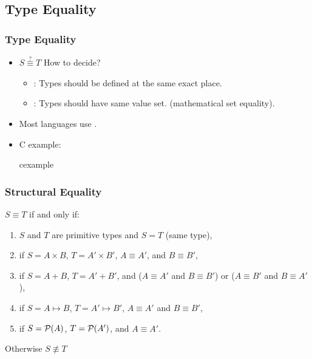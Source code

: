 
\subsection{Type Equality}
\begin{frame}
 \frametitle{Type Equality}
\begin{itemize}[<+->]
 \item $S \stackrel{?}{\equiv}  T$  How to decide?
\begin{itemize}
 \item {}: Types should be defined at the same exact place.
 \item {}: Types should have same value set. (mathematical set
 equality).
\end{itemize}
\item Most languages use .
\item C example:
\begin{beamercolorbox}{cexample}
\codeisimesit
\end{beamercolorbox}
\end{itemize}
\end{frame}

\begin{frame}
 \frametitle{Structural Equality}
$S \equiv T$ if and only if:
\begin{enumerate}
 \item $S$ and $T$ are primitive types and  $S = T$ (same type),
 \item if $S=A\times B$, $T=A'\times B'$, $A \equiv A'$, and $B \equiv B'$,
 \item if $S=A+B$, $T=A'+B'$, and ($A \equiv A'$ and $B \equiv B'$) or
	($A \equiv B'$ and $B \equiv A'$ ),
 \item if $S=A\mapsto B$, $T=A'\mapsto B'$, $A \equiv A'$ and $B \equiv B'$,
 \item if $S={\cal P}(A)$, $T={\cal P}(A')$, and $A \equiv A'$.
\end{enumerate}
Otherwise $S \not\equiv T$
\end{frame}


